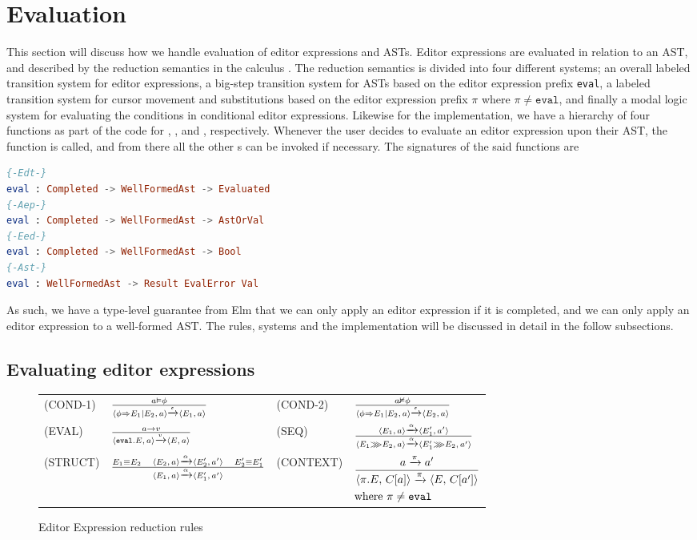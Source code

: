 \section{Evaluation}
\label{evaluation}

This section will discuss how we handle evaluation of editor expressions and
ASTs. Editor expressions are evaluated in relation to an AST, and described by
the reduction semantics in the calculus \pepm. The reduction semantics is
divided into four different systems; an overall labeled transition system for
editor expressions, a big-step transition system for ASTs based on the editor
expression prefix \texttt{eval}, a labeled transition system for cursor
movement and substitutions based on the editor expression prefix $\pi$ where
$\pi \neq \texttt{eval}$, and finally a modal logic system for evaluating the
conditions in conditional editor expressions. Likewise for the implementation,
we have a hierarchy of four  functions as part of the code for
, ,  and , respectively. Whenever the user
decides to evaluate an editor expression upon their AST, the function
 is called, and from there all the other s can be
invoked if necessary. The signatures of the said  functions are
\begin{lstlisting}[language=elm,%
                     label="eval-hiarchy",%
                     gobble=0,%
                     ]
{-Edt-}
eval : Completed -> WellFormedAst -> Evaluated
{-Aep-}
eval : Completed -> WellFormedAst -> AstOrVal
{-Eed-}
eval : Completed -> WellFormedAst -> Bool
{-Ast-}
eval : WellFormedAst -> Result EvalError Val
\end{lstlisting}
As such, we have a type-level guarantee from Elm that we can only apply an
editor expression if it is completed, and we can only apply an editor
expression to a well-formed AST. The rules, systems and the implementation will be
discussed in detail in the follow subsections.


\subsection{Evaluating editor expressions}
\begin{figure*}
  \center
  \renewcommand{\arraystretch}{2}
  \begin{tabular}{llll}
    \scriptsize(COND-1)  & $ \frac{a \vDash \phi} {\langle \phi \Rightarrow E_1|E_2,\, a \rangle\xrightarrow[]{\text{$\epsilon$}}\langle E_1,\, a \rangle} $           & \scriptsize(COND-2) & $ \frac{a \nvDash \phi} {\langle \phi \Rightarrow E_1|E_2,\, a \rangle\xrightarrow[]{\text{$\epsilon$}}\langle E_2,\, a \rangle}$ \\
    \scriptsize(EVAL)    & $ \frac{a \to v} {\langle \texttt{eval}.E,\, a \rangle\xrightarrow[]{\text{$v$}}\langle E,\, a \rangle} $              & \scriptsize(SEQ)    & $ \frac{\langle E_1,\, a \rangle\xrightarrow[]{\text{$\alpha$}}\langle E_1',\, a' \rangle} {\langle E_1 \ggg E_2,\, a \rangle\xrightarrow[]{\text{$\alpha$}}\langle E_1' \ggg E_2,\, a' \rangle}$     \\
    \scriptsize(STRUCT)  & $\frac{E_1 \equiv E_2\quad\langle E_2,\, a \rangle\xrightarrow[]{\text{$\alpha$}}\langle E_2',\, a' \rangle \quad E_2' \equiv E_1'} {\langle E_1,\, a \rangle\xrightarrow[]{\text{$\alpha$}}\langle E_1',\, a' \rangle}$              & \scriptsize(CONTEXT)& \scriptsize$\begin{aligned} & \frac{a \xrightarrow[]{\text{$\pi$}} a'} {\langle \pi.E,\, C[a] \rangle\xrightarrow[]{\text{$\pi$}}\langle E,\, C[a'] \rangle} \\ & \text{where } \pi \neq \texttt{eval} \end{aligned}$
  \end{tabular}
  \caption{Editor Expression reduction rules}
  \label{fig:edtreductionrules}
\end{figure*}

